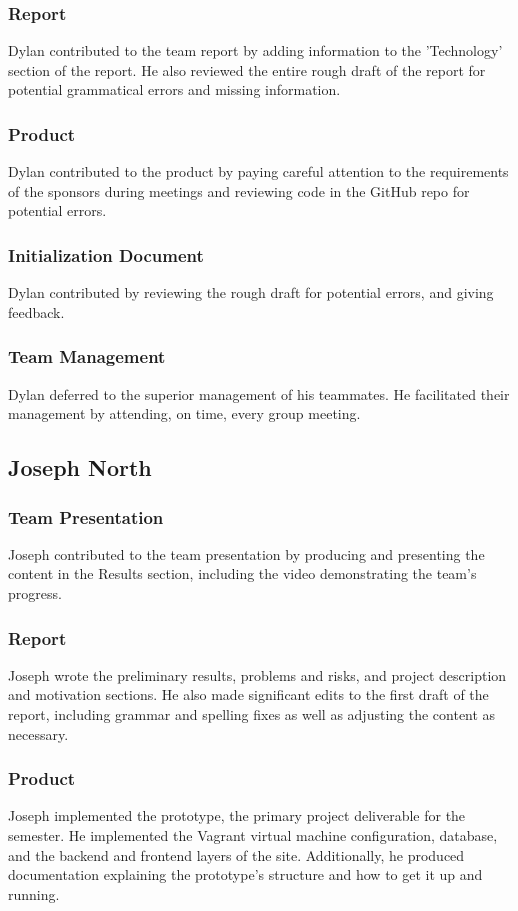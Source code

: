 \documentclass[12pt]{article}
\begin{document}
\begin{spacing}{1.5}
\subsubsection{Report}
Dylan contributed to the team report by adding information to the 'Technology' section of the report.  He also reviewed the entire rough draft of the report for potential grammatical errors and missing information.
\subsubsection{Product}
Dylan contributed to the product by paying careful attention to the requirements of the sponsors during meetings and reviewing code in the GitHub repo for potential errors.
\subsubsection{Initialization Document}
Dylan contributed by reviewing the rough draft for potential errors, and giving feedback. 
\subsubsection{Team Management}
Dylan deferred to the superior management of his teammates.  He facilitated their management by attending, on time, every group meeting.

\clearpage

\subsection{Joseph North}
\subsubsection{Team Presentation}
Joseph contributed to the team presentation by producing and presenting the content in the Results section, including the video demonstrating the team's progress.
\subsubsection{Report}
Joseph wrote the preliminary results, problems and risks, and project description and motivation sections. He also made significant edits to the first draft of the report, including grammar and spelling fixes as well as adjusting the content as necessary.
\subsubsection{Product}
Joseph implemented the prototype, the primary project deliverable for the semester. He implemented the Vagrant virtual machine configuration, database, and the backend and frontend layers of the site. Additionally, he produced documentation explaining the prototype's structure and how to get it up and running.

\end{spacing}
\end{document}

